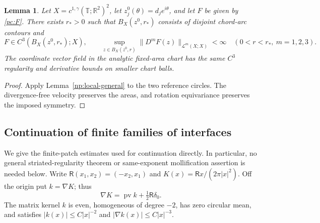\documentclass[11pt]{amsart}
\newtheorem{lemma}[theorem]{Lemma}
\theoremstyle{remark}
\numberwithin{equation}{section}
\newcommand{\R}{\mathbb R}
\newcommand{\T}{\mathbb T}
\begin{document}
\begin{lemma}
\label{pc:regularity}
Let $X=c^{1,\gamma}(\T;\R^2)^2$, let
$z_j^0(\theta)=d_je^{i\theta}$, and let $F$ be given by
\eqref{pc:F}. There exists $r_*>0$ such that
$B_X(z^0,r_*)$ consists of disjoint chord-arc contours and
\[
 F\in C^3(B_X(z^0,r_*);X),\qquad
 \sup_{z\in B_X(z^0,r)}\|D^mF(z)\|_{\mathcal L^m(X;X)}<\infty
 \quad(0<r<r_*,\ m=1,2,3).
\]
The coordinate vector field in the analytic fixed-area chart has
the same $C^3$ regularity and derivative bounds on smaller chart balls.
\end{lemma}
\begin{proof}
Apply Lemma~\ref{np:local-general} to the two reference circles.
The divergence-free velocity preserves the areas, and rotation
equivariance preserves the imposed symmetry.
\end{proof}

\subsection{Continuation of finite families of interfaces}

We give the finite-patch estimates used for continuation directly.
In particular, no general striated-regularity theorem or
same-exponent mollification assertion is needed below. Write
$\mathsf R(x_1,x_2)=(-x_2,x_1)$ and
$K(x)=\mathsf R x/(2\pi|x|^2)$. Off the origin put $k=\nabla K$; thus
\[
 \nabla K=\operatorname{pv}k+\tfrac12\mathsf R\delta_0.
\]
The matrix kernel $k$ is even, homogeneous of degree $-2$, has
zero circular mean, and satisfies $|k(x)|\le C|x|^{-2}$ and
$|\nabla k(x)|\le C|x|^{-3}$.
\end{document}
